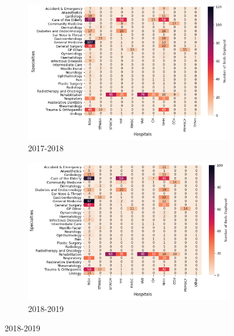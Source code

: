 \documentclass[../thesis.tex]{subfiles}
\begin{document}
\begin{figure}
     \centering
     \begin{subfigure}[h!]{0.8\textwidth}
         \centering
         \includegraphics[width=\textwidth]{Chapters/Chapter5/Figures/2017DET.png}
         \caption{2017-2018}
         \label{fig:detexp2a}
     \end{subfigure}
\hfill
     \begin{subfigure}{0.8\textwidth}
         \centering
         \includegraphics[width=\textwidth]{Chapters/Chapter5/Figures/2018DET.png}
         \caption{2018-2019}
         \label{fig:detexp2b}
     \end{subfigure}
     \end{figure}
\hfill
\end{document}
